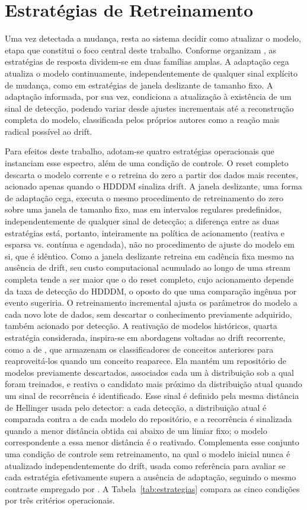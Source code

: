 \section{Estratégias de Retreinamento}
\label{sec:estrategias}
Uma vez detectada a mudança, resta ao sistema decidir como atualizar o modelo,
etapa que constitui o foco central deste trabalho. Conforme organizam
, as estratégias de resposta dividem-se em duas famílias
amplas. A adaptação cega atualiza o modelo continuamente, independentemente de
qualquer sinal explícito de mudança, como em estratégias de janela deslizante
de tamanho fixo. A adaptação informada, por sua vez, condiciona a atualização
à existência de um sinal de detecção, podendo variar desde ajustes
incrementais até a reconstrução completa do modelo, classificada pelos
próprios autores como a reação mais radical possível ao drift.

Para efeitos deste trabalho, adotam-se quatro estratégias operacionais que
instanciam esse espectro, além de uma condição de controle. O reset completo
descarta o modelo corrente e o retreina do zero a partir dos dados mais
recentes, acionado apenas quando o HDDDM sinaliza drift. A janela
deslizante, uma forma de adaptação cega, executa o mesmo procedimento de
retreinamento do zero sobre uma janela de tamanho fixo, mas em intervalos
regulares predefinidos, independentemente de qualquer sinal de detecção;
a diferença entre as duas estratégias está, portanto, inteiramente na
política de acionamento (reativa e esparsa vs. contínua e agendada), não no
procedimento de ajuste do modelo em si, que é idêntico. Como a janela
deslizante retreina em cadência fixa mesmo na ausência de drift, seu custo
computacional acumulado ao longo de uma stream completa tende a ser maior
que o do reset completo, cujo acionamento depende da taxa de detecção do
HDDDM, o oposto do que uma comparação ingênua por evento sugeriria. O
retreinamento incremental ajusta os parâmetros do modelo a cada novo lote de
dados, sem descartar o conhecimento previamente adquirido, também acionado
por detecção. A reativação de modelos históricos, quarta estratégia
considerada, inspira-se em abordagens voltadas ao drift recorrente, como a de
, que armazenam os classificadores de conceitos
anteriores para reaproveitá-los quando um conceito reaparece. Ela mantém um
repositório de modelos previamente descartados,
associados cada um à distribuição sob a qual foram treinados, e reativa o
candidato mais próximo da distribuição atual quando um sinal de recorrência
é identificado. Esse sinal é definido pela mesma distância de Hellinger
usada pelo detector: a cada detecção, a distribuição atual é comparada
contra a de cada modelo do repositório, e a recorrência é sinalizada quando
a menor distância obtida cai abaixo de um limiar fixo; o modelo
correspondente a essa menor distância é o reativado. Complementa esse
conjunto uma condição de controle sem retreinamento, na qual o modelo
inicial nunca é atualizado independentemente do drift, usada como
referência para avaliar se cada estratégia efetivamente supera a ausência
de adaptação, seguindo o mesmo contraste empregado por .
A Tabela~\ref{tab:estrategias} compara as cinco condições por três
critérios operacionais.

